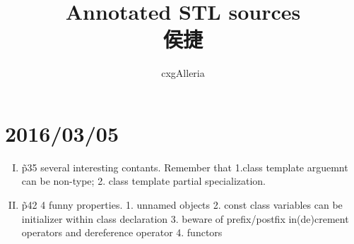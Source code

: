 \documentclass{ctexart}
\begin{document}
\title{%
	Annotated STL sources\\
		侯捷
}
\author{%
	cxgAlleria
}
\maketitle

\tableofcontents
\section[0305]{2016/03/05}
	\begin{enumerate}[I.]
		\item \~ p35 several interesting contants. Remember that 1.class template arguemnt can be non-type; 2. class template partial specialization.
		\item \~ p42 4 funny properties. 1. unnamed objects 2. const class variables can be initializer within class declaration 3. beware of prefix/postfix in(de)crement operators and dereference operator 4. functors
	\end{enumerate}
\end{document}
